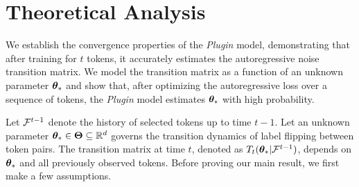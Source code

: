 \section{Theoretical Analysis}
\label{sec:theory}






We establish the convergence properties of the \textit{Plugin} model, demonstrating that after training for $t$ tokens, it accurately estimates the autoregressive noise transition matrix. We model the transition matrix as a function of an unknown parameter $\bm{\theta}_*$ and show that, after optimizing the autoregressive loss over a sequence of tokens, the \textit{Plugin} model estimates $\bm{\theta}_*$ with high probability.

Let $\mathcal{F}^{t-1}$ denote the history of selected tokens up to time $t-1$. Let an unknown parameter $\bm{\theta}_* \in \bm{\Theta} \subseteq \mathbb{R}^d$ governs the transition dynamics of label flipping between token pairs. The transition matrix at time $t$, denoted as $T_t(\bm{\theta}_* | \mathcal{F}^{t-1})$, depends on $\bm{\theta}_*$ and all previously observed tokens. Before proving our main result, we first make a few assumptions. 


%


